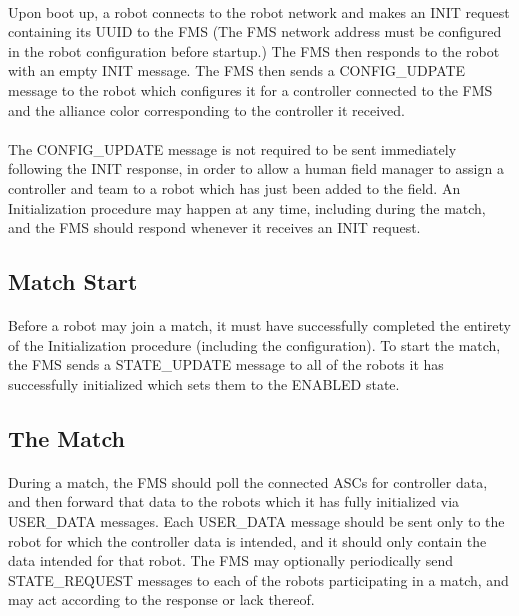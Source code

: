 \documentclass[11pt]{article}
\begin{document}
\paragraph{}
Upon boot up, a robot connects to the robot network and makes an INIT request containing its UUID to the FMS 
(The FMS network address must be configured in the robot configuration before startup.) 
The FMS then responds to the robot with an empty INIT message. 
The FMS then sends a CONFIG\_UDPATE message to the robot which configures it for a controller connected 
to the FMS and the alliance color corresponding to the controller it received. 
\paragraph{}
The CONFIG\_UPDATE message is not required to be sent immediately following the INIT response, 
in order to allow a human field manager to assign a controller and team to a robot which has just been added to the field.
An Initialization procedure may happen at any time, including during the match,
and the FMS should respond whenever it receives an INIT request.

\subsection{Match Start}
\paragraph{}
Before a robot may join a match, it must have successfully completed the entirety of the Initialization procedure 
(including the configuration).  
To start the match, the FMS sends a STATE\_UPDATE message to all of the robots it has successfully initialized 
which sets them to the ENABLED state.

\subsection {The Match}
\paragraph{}
During a match, the FMS should poll the connected ASCs for controller data, 
and then forward that data to the robots which it has fully initialized via USER\_DATA messages.
Each USER\_DATA message should be sent only to the robot for which the controller data is intended,
and it should only contain the data intended for that robot.
The FMS may optionally periodically send STATE\_REQUEST messages to each of the robots participating in a match,
and may act according to the response or lack thereof.
\end{document}
